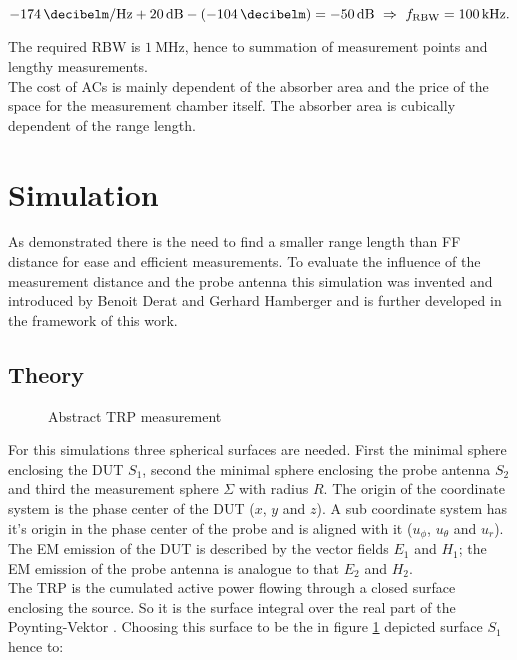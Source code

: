 \begin{equation}
\SI{-174}{\decibelm\per\hertz}+\SI{20}{\decibel}-\left(\SI{-104}{\decibelm}\right)=\SI{-50}{\decibel}\ \Rightarrow\ f_{\text{RBW}}=\SI{100}{\kilo\hertz}.
\end{equation}

The required \ac{RBW} is $\SI{1}{\mega\hertz}$, hence to summation of measurement points and lengthy measurements.\\
The cost of \acp{AC} is mainly dependent of the absorber area and the price of the space for the measurement chamber itself. The absorber area is cubically dependent of the range length.
\section{Simulation}

As demonstrated there is the need to find a smaller range length than \ac{FF} distance for ease and efficient measurements. To evaluate the influence of the measurement distance and the probe antenna this simulation was invented and introduced by Benoit Derat and Gerhard Hamberger \cite{mypaper} and is further developed in the framework of this work.

\subsection{Theory}

\begin{figure}[h]
\centering
\def\svgwidth{0.5\textwidth}

\caption{Abstract TRP measurement}
\label{fig:trpmeas}
\end{figure}

For this simulations three spherical surfaces are needed. First the minimal sphere enclosing the \ac{DUT} $S_1$, second the minimal sphere enclosing the probe antenna $S_2$ and third the measurement sphere $\Sigma$ with radius $R$. The origin of the coordinate system is the phase center of the \ac{DUT} ($x$, $y$ and $z$). A sub coordinate system has it's origin in the phase center of the probe and is aligned with it ($u_\phi$, $u_\theta$ and $u_r$). The \ac{EM} emission of the \ac{DUT} is described by the vector fields $E_1$ and $H_1$; the \ac{EM} emission of the probe antenna is analogue to that $E_2$ and $H_2$.\\
The \ac{TRP} is the cumulated active power flowing through a closed surface enclosing the source. So it is the surface integral over the real part of the Poynting-Vektor \cite{mypaper}. Choosing this surface to be the in figure \ref{fig:trpmeas} depicted surface $S_1$ hence to:

